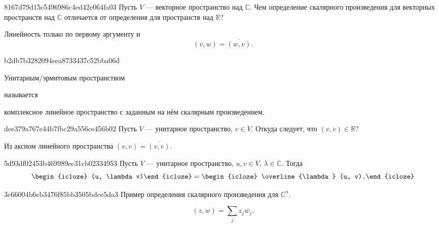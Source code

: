 \begin{note}{8167d79d15c5496986c4ed42e064fa03}
    Пусть \({ V }\) --- векторное пространство над \({ \mathbb C }\).
    Чем определение скалярного произведения для векторных пространств над \({ \mathbb C }\) отличается от определения для пространств над \({ \mathbb R }\)?

    \begin{cloze}{1}
        Линейность только по первому аргументу и
        \[
            (v, w) = \overline{(w, v)}.
        \]
    \end{cloze}
\end{note}

\begin{note}{b2db7b3282094eea8733437c52bba06d}
    \begin{icloze}{1}Унитарным/эрмитовым пространством\end{icloze} называется \begin{icloze}{2}комплексное линейное пространство с заданным на нём скалярным произведением.\end{icloze}
\end{note}

\begin{note}{dee379a767e44b7fbc29a556ce456b02}
    Пусть \({ V }\) --- унитарное пространство, \({ v \in V }\).
    Откуда следует, что \({ (v, v) \in \mathbb R }\)?

    \begin{cloze}{1}
        Из аксиом линейного пространства \({ (v, v) = \overline{(v, v)} }\).
    \end{cloze}
\end{note}

\begin{note}{5d93df02453b469989ec31cb02334953}
    Пусть \({ V }\) --- унитарное пространство, \({ u, v \in V }\),\: \({ \lambda \in \mathbb C }\).
    Тогда
    \[
        \begin{icloze}{2}(u, \lambda v)\end{icloze} = \begin{icloze}{1}\overline{\lambda} (u, v).\end{icloze}
    \]
\end{note}

\begin{note}{3c66004b6eb3476f85bb3505bdce5da3}
    Пример определения скалярного произведения для \({ \mathbb C^{n} }\).

    \begin{cloze}{1}
        \[
            (z, w) = \sum_{j} z_j \overline{w_j}.
        \]
    \end{cloze}
\end{note}

